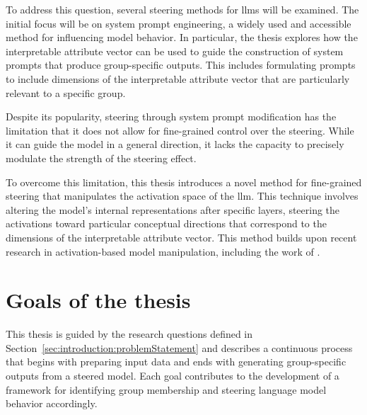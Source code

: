 
To address this question, several steering methods for \acp{llm} will be examined. The initial focus will be on system prompt engineering, a widely used and accessible method for influencing model behavior. In particular, the thesis explores how the interpretable attribute vector can be used to guide the construction of system prompts that produce group-specific outputs. This includes formulating prompts to include dimensions of the interpretable attribute vector that are particularly relevant to a specific group.


Despite its popularity, steering through system prompt modification has the limitation that it does not allow for fine-grained control over the steering. While it can guide the model in a general direction, it lacks the capacity to precisely modulate the strength of the steering effect.

To overcome this limitation, this thesis introduces a novel method for fine-grained steering that manipulates the activation space of the \ac{llm}. This technique involves altering the model's internal representations after specific layers, steering the activations toward particular conceptual directions that correspond to the dimensions of the interpretable attribute vector. This method builds upon recent research in activation-based model manipulation, including the work of \citet{konenStyleVectorsSteering2024,turnerActivationAdditionSteering2024,rimsky-etal-2024-steering}.



\section{Goals of the thesis}
\label{sec:introduction:goals}
\newlength{\maxstretch}
\setlength{\maxstretch}{0pt plus 1fill}
This thesis is guided by the research questions defined in Section~\ref{sec:introduction:problemStatement} and describes a continuous process that begins with preparing input data and ends with generating group-specific outputs from a steered model. Each goal contributes to the development of a framework for identifying group membership and steering language model behavior accordingly.

